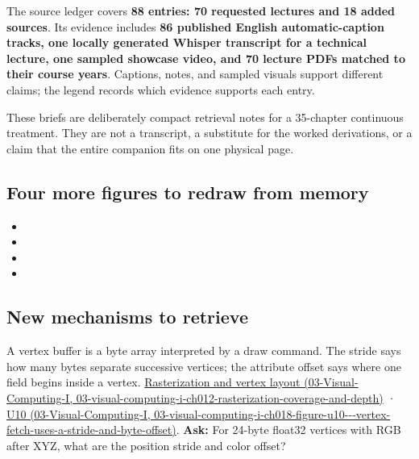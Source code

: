 The source ledger covers \textbf{88 entries: 70 requested lectures and 18 added sources}. Its evidence includes \textbf{86 published English automatic-caption tracks, one locally generated Whisper transcript for a technical lecture, one sampled showcase video, and 70 lecture PDFs matched to their course years}. Captions, notes, and sampled visuals support different claims; the legend records which evidence supports each entry.

These briefs are deliberately compact retrieval notes for a 35-chapter continuous treatment. They are not a transcript, a substitute for the worked derivations, or a claim that the entire companion fits on one physical page.

\subsection{Four more figures to redraw from memory}\label{appendix-a8f634b076b5-four-more-figures-to-redraw-from-memory}

\begin{itemize}
\tightlist
\item
\item
\item
\item
\end{itemize}

\subsection{New mechanisms to retrieve}\label{appendix-a8f634b076b5-new-mechanisms-to-retrieve}

A vertex buffer is a byte array interpreted by a draw command. The stride says how many bytes separate successive vertices; the attribute offset says where one field begins inside a vertex. \href{../03-Visual-Computing-I/main.pdf\#nameddest=03-visual-computing-i-ch012-rasterization-coverage-and-depth}{Rasterization and vertex layout (03-Visual-Computing-I, 03-visual-computing-i-ch012-rasterization-coverage-and-depth)} · \href{../03-Visual-Computing-I/main.pdf\#nameddest=03-visual-computing-i-ch018-figure-u10---vertex-fetch-uses-a-stride-and-byte-offset}{U10 (03-Visual-Computing-I, 03-visual-computing-i-ch018-figure-u10-\/-\/-vertex-fetch-uses-a-stride-and-byte-offset)}. \textbf{Ask:} For 24-byte float32 vertices with RGB after XYZ, what are the position stride and color offset?

